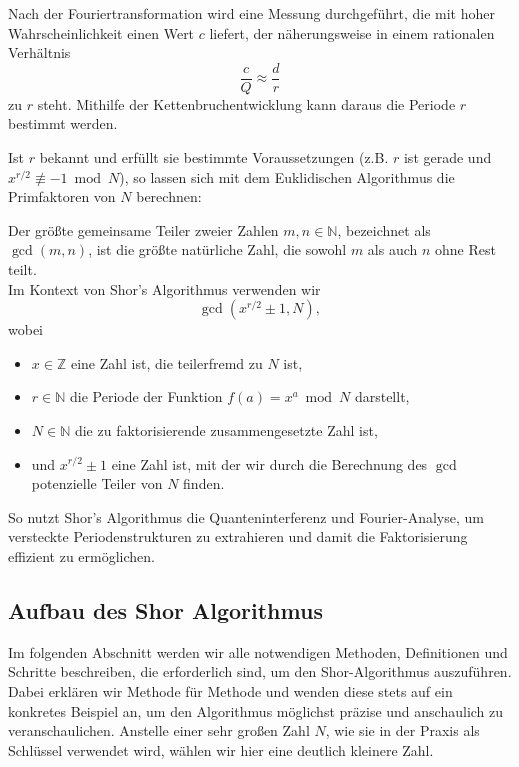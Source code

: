 Nach der Fouriertransformation wird eine Messung durchgeführt, die mit hoher Wahrscheinlichkeit einen Wert \( c \) liefert, der näherungsweise in einem rationalen Verhältnis  
\[
\frac{c}{Q} \approx \frac{d}{r}
\]
zu \( r \) steht. Mithilfe der Kettenbruchentwicklung kann daraus die Periode \( r \) bestimmt werden.

Ist \( r \) bekannt und erfüllt sie bestimmte Voraussetzungen (z.B. \( r \) ist gerade und \( x^{r/2} \not\equiv -1 \bmod N \)), so lassen sich mit dem Euklidischen Algorithmus die Primfaktoren von \( N \) berechnen:  
\begin{definition}
Der größte gemeinsame Teiler zweier Zahlen \(m, n \in \mathbb{N}\), bezeichnet als \(\gcd(m,n)\), ist die größte natürliche Zahl, die sowohl \(m\) als auch \(n\) ohne Rest teilt.\\

Im Kontext von Shor's Algorithmus verwenden wir
\[
\gcd\left(x^{r/2} \pm 1, N\right),
\]
wobei
\begin{itemize}
    \item \(x \in \mathbb{Z}\) eine Zahl ist, die teilerfremd zu \(N\) ist,
    \item \(r \in \mathbb{N}\) die Periode der Funktion \(f(a) = x^a \bmod N\) darstellt,
    \item \(N \in \mathbb{N}\) die zu faktorisierende zusammengesetzte Zahl ist,
    \item und \(x^{r/2} \pm 1\) eine Zahl ist, mit der wir durch die Berechnung des \(\gcd\) potenzielle Teiler von \(N\) finden.
\end{itemize}
\end{definition}

So nutzt Shor's Algorithmus die Quanteninterferenz und Fourier-Analyse, um versteckte Periodenstrukturen zu extrahieren und damit die Faktorisierung effizient zu ermöglichen.

\subsection{Aufbau des Shor Algorithmus}

Im folgenden Abschnitt werden wir alle notwendigen Methoden, Definitionen und Schritte beschreiben, die erforderlich sind, um den Shor-Algorithmus auszuführen. Dabei erklären wir Methode für Methode und wenden diese stets auf ein konkretes Beispiel an, um den Algorithmus möglichst präzise und anschaulich zu veranschaulichen. Anstelle einer sehr großen Zahl \( N \), wie sie in der Praxis als Schlüssel verwendet wird, wählen wir hier eine deutlich kleinere Zahl. \\

